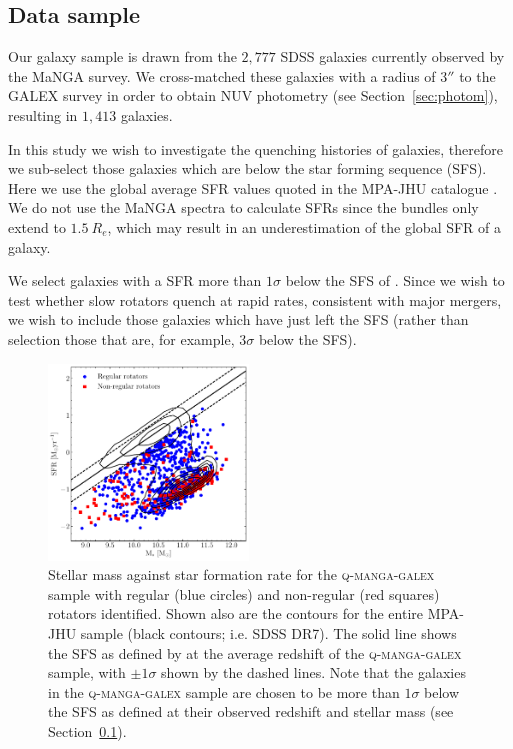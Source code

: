 \documentclass[useAMS,usenatbib]{mn2e}
\begin{document}
\subsection{Data sample}\label{sec:mangasample}

Our galaxy sample is drawn from the $2,777$ SDSS galaxies currently observed by the MaNGA survey. We cross-matched these galaxies with a radius of $3''$ to the GALEX survey in order to obtain NUV photometry (see Section~\ref{sec:photom}), resulting in $1,413$ galaxies.

In this study we wish to investigate the quenching histories of galaxies, therefore we sub-select those galaxies which are below the star forming sequence (SFS). Here we use the global average SFR values quoted in the MPA-JHU catalogue \citep[][which are corrected for aperture bias]{kauffmann03, brinchmann04}. We do not use the MaNGA spectra to calculate SFRs since the bundles only extend to $1.5~R_e$, which may result in an underestimation of the global SFR of a galaxy. 

We select galaxies with a SFR more than $1\sigma$ below the SFS of \cite{peng10}. Since we wish to test whether slow rotators quench at rapid rates, consistent with major mergers, we wish to include those galaxies which have just left the SFS (rather than selection those that are, for example, $3\sigma$ below the SFS).

\begin{figure}
\centering
\includegraphics[width=0.475\textwidth]{../figures/nonSF_FR_SR_SFS_scatter.pdf}
\caption{Stellar mass against star formation rate for the \textsc{q-manga-galex} sample with regular (blue circles) and non-regular (red squares) rotators identified. Shown also are the contours for the entire MPA-JHU sample (black contours; i.e. SDSS DR7). The solid line shows the SFS as defined by \protect\cite{peng10} at the average redshift of the \textsc{q-manga-galex} sample, with $\pm 1 \sigma$ shown by the dashed lines. Note that the galaxies in the \textsc{q-manga-galex} sample are chosen to be more than $1\sigma$ below the SFS as defined at their observed redshift and stellar mass (see Section~\protect\ref{sec:mangasample}).}
\label{fig:masvsfr}
\end{figure}
\end{document}
